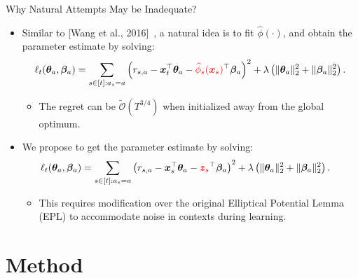 \documentclass[10pt, xcolor={dvipsnames,x11names},compress]{beamer}
\begin{document}
\begin{frame}[label=warmup]{Why Natural Attempts May be Inadequate?}
\begin{itemize}
    \item Similar to [Wang et al., 2016]~, a natural idea is to fit $\widehat{\phi}(\cdot)$, and obtain the parameter estimate by solving:
    {\small
    \begin{align}
    \ell_t ({\bm{\theta}}_a, {\bm{\beta}}_a) = \sum_{s\in [t]: a_s = a}  \left(r_{s, a} - {\bm{x}}_t^\top {\bm{\theta}}_{a} - \textcolor{red}{\widehat{\phi}_{s}({\bm{x}}_s)}^\top {\bm{\beta}}_{a}\right)^2+\lambda \left( \|{\bm{\theta}}_a\|_2^2 +  \|{\bm{\beta}}_a\|_2^2 \right). \nonumber
    \end{align}
    }
    \begin{itemize}
        \item The regret can be $\widetilde{\mathcal{O}}({T^{3/4}})$ when initialized away from the global optimum.
    \end{itemize}
    \vspace{+6pt}
    \item We propose to get the parameter estimate by solving:
    {\small
    \begin{align}\label{eqn:w-closed-form}
    \ell_t ({\bm{\theta}}_a, {\bm{\beta}}_a) &= \sum_{s\in[t]: a_s = a}  \left(r_{s, a} - {\bm{x}}_s^\top {\bm{\theta}}_{a} - {\color{red}{{\bm{z}}_s}}^{\top} {\bm{\beta}}_{a}\right)^2+\lambda \left(\|{\bm{\theta}}_a\|_2^2 + \|{\bm{\beta}}_{a}\|_{2}^{2}\right). \nonumber
    \end{align}
    }  
    \begin{itemize}
        \item This requires modification over the original Elliptical Potential Lemma (EPL) to accommodate noise in contexts during learning.
    \end{itemize}
\end{itemize}


\end{frame}

\section{Method}
\end{document}
